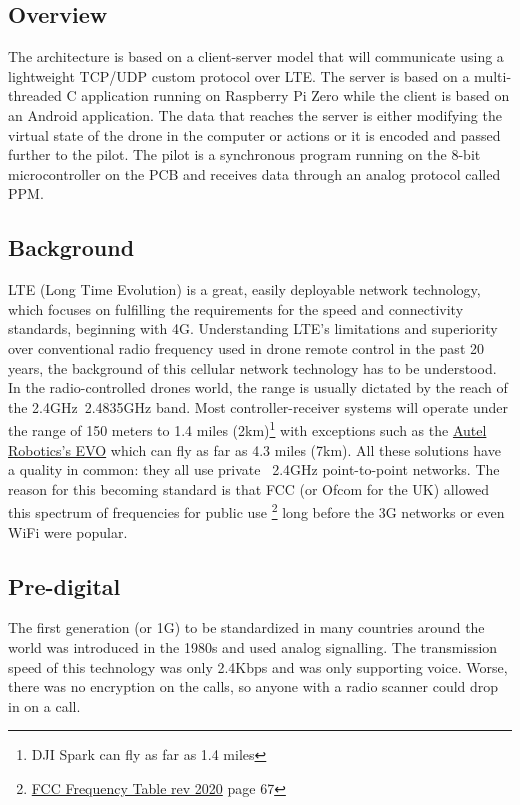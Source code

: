 \documentclass{IEEEtran}
\begin{document}
\subsection*{\large{Overview}}
The architecture is based on a client-server model that will communicate using a lightweight TCP/UDP custom protocol over LTE. The server is based on a multi-threaded C application running on Raspberry Pi Zero while the client is based on an Android application. The data that reaches the server is either modifying the virtual state of the drone in the computer or actions or it is encoded and passed further to the pilot. The pilot is a synchronous program running on the 8-bit microcontroller on the PCB and receives data through an analog protocol called PPM.
\subsection*{\large{Background}}
LTE (Long Time Evolution) is a great, easily deployable network technology, which focuses on fulfilling the requirements for the speed and connectivity standards, beginning with 4G. Understanding LTE's limitations and superiority over conventional radio frequency used in drone remote control in the past 20 years, the background of this cellular network technology has to be understood.
\newline
\newline
In the radio-controlled drones world, the range is usually dictated by the reach of the 2.4GHz~2.4835GHz band. Most controller-receiver systems will operate under the range of 150 meters to 1.4 miles (2km)\footnote{DJI Spark can fly as far as 1.4 miles} with exceptions such as the \hyperlink{https://auteldrones.com/products/evo}{Autel Robotics's EVO} which can fly as far as 4.3 miles (7km). All these solutions have a quality in common: they all use private ~2.4GHz point-to-point networks. The reason for this becoming standard is that FCC (or Ofcom for the UK) allowed this spectrum of frequencies for public use  \footnote{\hyperlink{https://transition.fcc.gov/oet/spectrum/table/fcctable.pdf}{FCC Frequency Table rev 2020} page 67} long before the 3G networks or even WiFi were popular.
\subsection*{Pre-digital}
The first generation (or 1G) to be standardized in many countries around the world was introduced in the 1980s and used analog signalling. The transmission speed of this technology was only 2.4Kbps and was only supporting voice. Worse, there was no encryption on the calls, so anyone with a radio scanner could drop in on a call.
\end{document}
